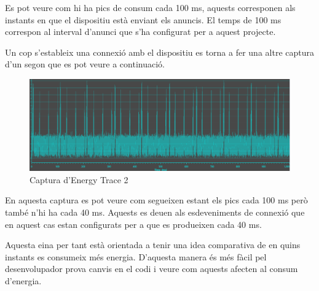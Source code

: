 Es pot veure com hi ha pics de consum cada 100 ms, aquests corresponen als instants en que el dispositiu està enviant els anuncis.
El temps de 100 ms correspon al interval d'anunci que s'ha configurat per a aquest projecte.

Un cop s'estableix una connexió amb el dispositiu es torna a fer una altre captura d'un segon que es pot veure a continuació.

\begin{figure}[!h]
	\begin{center}
		\includegraphics[width=\textwidth]{./images/energy_trace_2.png}
		\caption{Captura d'Energy Trace 2}
	\end{center}
\end{figure}

En aquesta captura es pot veure com segueixen estant els pics cada 100 ms però també n'hi ha cada 40 ms.
Aquests es deuen als esdeveniments de connexió que en aquest cas estan configurats per a que es produeixen cada 40 ms.

Aquesta eina per tant està orientada a tenir una idea comparativa de en quins instants es consumeix més energia.
D'aquesta manera és més fàcil pel desenvolupador prova canvis en el codi i veure com aquests afecten al consum d'energia.




